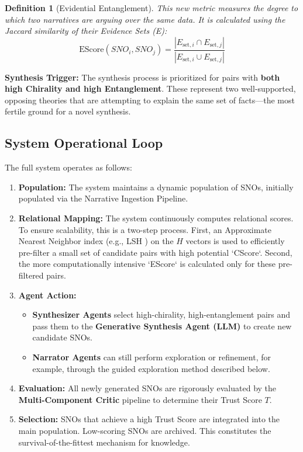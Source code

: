 \documentclass[12pt, a4paper]{article}
\newtheorem{definition}{Definition}[section]
\begin{document}
\begin{definition}[Evidential Entanglement]
This new metric measures the degree to which two narratives are arguing over the same data. It is calculated using the Jaccard similarity of their \textit{Evidence Sets (E)}:
\[
\text{EScore}(SNO_i, SNO_j) = \frac{|E_{\text{set}, i} \cap E_{\text{set}, j}|}{|E_{\text{set}, i} \cup E_{\text{set}, j}|}
\]
\end{definition}

\textbf{Synthesis Trigger:} The synthesis process is prioritized for pairs with \textbf{both high Chirality and high Entanglement}. These represent two well-supported, opposing theories that are attempting to explain the same set of facts—the most fertile ground for a novel synthesis.

\subsection{System Operational Loop}
The full system operates as follows:
\begin{enumerate}
    \item \textbf{Population:} The system maintains a dynamic population of SNOs, initially populated via the Narrative Ingestion Pipeline.
    \item \textbf{Relational Mapping:} The system continuously computes relational scores. To ensure scalability, this is a two-step process. First, an Approximate Nearest Neighbor index (e.g., LSH \citep{Indyk1998LSH}) on the $H$ vectors is used to efficiently pre-filter a small set of candidate pairs with high potential `CScore`. Second, the more computationally intensive `EScore` is calculated only for these pre-filtered pairs.
    \item \textbf{Agent Action:}
        \begin{itemize}
            \item \textbf{Synthesizer Agents} select high-chirality, high-entanglement pairs and pass them to the \textbf{Generative Synthesis Agent (LLM)} to create new candidate SNOs.
            \item \textbf{Narrator Agents} can still perform exploration or refinement, for example, through the guided exploration method described below.
        \end{itemize}
    \item \textbf{Evaluation:} All newly generated SNOs are rigorously evaluated by the \textbf{Multi-Component Critic} pipeline to determine their Trust Score $T$.
    \item \textbf{Selection:} SNOs that achieve a high Trust Score are integrated into the main population. Low-scoring SNOs are archived. This constitutes the survival-of-the-fittest mechanism for knowledge.
\end{enumerate}
\end{document}
